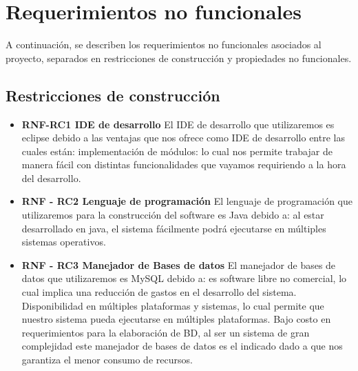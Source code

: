 \section{Requerimientos no funcionales}

A continuación, se describen los requerimientos no funcionales asociados al proyecto, separados en restricciones de construcción y propiedades no funcionales.


\subsection{Restricciones de construcción}

\begin{itemize}
	\item \textbf{RNF-RC1 IDE de desarrollo} El IDE de desarrollo que utilizaremos es eclipse debido a las ventajas que nos ofrece como IDE de desarrollo entre las cuales están: implementación de módulos: lo cual nos permite trabajar de manera fácil con distintas funcionalidades que vayamos requiriendo a la hora del desarrollo.
	
	\item \textbf{RNF - RC2 Lenguaje de programación} El lenguaje de programación que utilizaremos para la construcción del software es Java debido a: al estar desarrollado en java, el sistema fácilmente podrá ejecutarse en múltiples sistemas operativos.
	
	\item\textbf{RNF - RC3 Manejador de Bases de datos} El manejador de bases de datos que utilizaremos es MySQL debido a: es software libre no comercial, lo cual implica una reducción de gastos en el desarrollo del sistema. Disponibilidad en múltiples plataformas y sistemas, lo cual permite que nuestro sistema pueda ejecutarse en múltiples plataformas. Bajo costo en requerimientos para la elaboración de BD, al ser un sistema de gran complejidad este manejador de bases de datos es el indicado dado a que nos garantiza el menor consumo de recursos.
	
\end{itemize}


